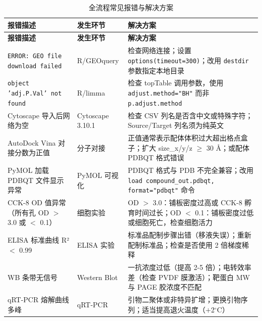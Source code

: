 \documentclass[12pt,a4paper,twoside]{article}
\begin{document}
\begin{longtable}{p{4cm}p{4cm}p{6cm}}
\caption{全流程常见报错与解决方案} \label{tab:faq} \\
\toprule
\textbf{报错描述} & \textbf{发生环节} & \textbf{解决方案} \\
\midrule
\endfirsthead
\toprule
\textbf{报错描述} & \textbf{发生环节} & \textbf{解决方案} \\
\midrule
\endhead
\bottomrule
\endlastfoot
\texttt{ERROR: GEO file download failed} & R/GEOquery & 检查网络连接；设置 \texttt{options(timeout=300)}；改用 \texttt{destdir} 参数指定本地目录 \\
\addlinespace
\texttt{object 'adj.P.Val' not found} & R/limma & 检查 topTable 调用参数，使用 \texttt{adjust.method="BH"} 而非 \texttt{p.adjust.method} \\
\addlinespace
Cytoscape 导入后网络为空 & Cytoscape 3.10.1 & 检查 CSV 列名是否含中文或特殊字符；Source/Target 列名须为纯英文 \\
\addlinespace
AutoDock Vina 对接分数为正值 & 分子对接 & 正值通常表示配体体积过大超出格点盒子；扩大 size\_x/y/z $\geq$ 30 Å；或配体 PDBQT 格式错误 \\
\addlinespace
PyMOL 加载 PDBQT 文件显示异常 & PyMOL 可视化 & PDBQT 格式与 PDB 不完全兼容；改用 \texttt{load compound\_out.pdbqt, format="pdbqt"} 命令 \\
\addlinespace
CCK-8 OD 值异常（所有孔 OD $>$ 3.0 或 $<$ 0.1）& 细胞实验 & OD $>$ 3.0：铺板密度过高或 CCK-8 孵育时间过长；OD $<$ 0.1：铺板密度过低或细胞死亡，检查细胞活力 \\
\addlinespace
ELISA 标准曲线 R² $<$ 0.99 & ELISA 实验 & 标准品配制步骤出错（移液失误）；重新配制标准品；检查是否使用 2 倍梯度稀释 \\
\addlinespace
WB 条带无信号 & Western Blot & 一抗浓度过低（提高 2-5 倍）；电转效率差（检查 PVDF 膜激活）；靶蛋白 MW 与 PAGE 胶浓度不匹配 \\
\addlinespace
qRT-PCR 熔解曲线多峰 & qRT-PCR & 引物二聚体或非特异扩增；更换引物序列；适当提高退火温度（$+$2$^{\circ}$C）\\
\bottomrule
\end{longtable}

\end{document}
